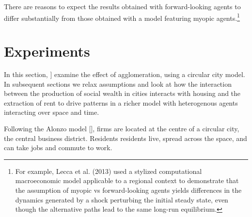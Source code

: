 There are reasons to expect the results obtained with  forward-looking agents to differ substantially from those obtained with a model featuring myopic agents.\footnote{For example, Lecca et al. (2013) used a stylized computational macroeconomic model applicable to a regional context to demonstrate that the assumption of myopic vs forward-looking agents yields differences in the dynamics generated by a shock perturbing the initial steady state, even though the alternative paths lead to the same long-run equilibrium.} 

 



\section{Experiments}
In this section, ] examine the effect of agglomeration, using a circular city model. In subsequent sections we relax assumptions and look at how the interaction between the production of social wealth in cities interacts with housing and the extraction of rent to drive patterns in a richer model with heterogenous agents interacting over space and time. 



Following the Alonzo model [], firms are located at the centre of a circular city, the central business district. Residents residents live, spread across the space, and can take jobs and commute to work.

